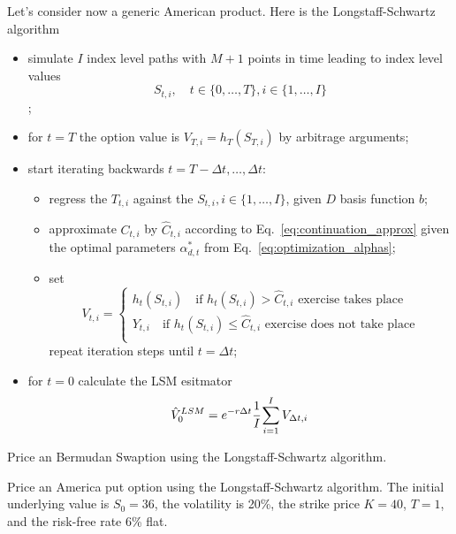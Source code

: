\documentclass[12pt,a4paper]{article}
\begin{document}
Let's consider now a generic American product. Here is the Longstaff-Schwartz algorithm
\begin{itemize}
	\item simulate $I$ index level paths with $M+1$ points in time leading to index level values
	\begin{equation*}
		S_{t,i},\quad t \in \{0,\ldots,T\}, i \in \{1,\ldots,I\}
	\end{equation*};
	\item for $t=T$ the option value is $V_{T,i}=h_T(S_{T,i})$ by arbitrage arguments;
	\item start iterating backwards $t = T-\Delta t, \ldots,\Delta t$:
	\begin{itemize}
		\item regress the $T_{t,i}$ against the $S_{t,i}, i\in \{1,\ldots, I\}$, given $D$ basis function $b$;
		\item approximate $C_{t,i}$ by $\hat{C}_{t,i}$ according to Eq.~\ref{eq:continuation_approx} given the optimal parameters $\alpha^*_{d,t}$ from Eq.~\ref{eq:optimization_alphas};
		\item set 
		\begin{equation*}
			V_{t,i}=
			\begin{cases}
				h_t(S_{t,i})\quad\text{if }h_t(S_{t,i})>\hat{C}_{t,i}\text{ exercise takes place}\\
				Y_{t,i}\quad\text{if }h_t(S_{t,i})\leq\hat{C}_{t,i}\text{ exercise does not take place}\\
			\end{cases}
		\end{equation*}
		repeat iteration steps until $t=\Delta t$;
	\end{itemize} 
	\item for $t=0$ calculate the LSM esitmator
	\begin{equation}
		\hat{V}_0^{LSM}=e^{-r\Delta t}\cfrac{1}{I}\sum_{i=1}^{I}V_{\Delta t, i}
	\end{equation} 
\end{itemize}

\begin{question}
Price an Bermudan Swaption using the Longstaff-Schwartz algorithm. %
\end{question}

\begin{question}
Price an America put option using the Longstaff-Schwartz algorithm. The initial underlying value is $S_0=36$, the volatility is 20\%, the strike price $K=40$, $T=1$, and the risk-free rate 6\% flat.	
\end{question}
\end{document}
